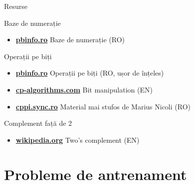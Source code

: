 \documentclass{beamer}
\begin{document}
\begin{frame}{Resurse}
  \begin{block}{Baze de numerație}
    \begin{itemize}
      \item \href{https://www.pbinfo.ro/articole/5562/baze-de-numeratie}{\textbf{pbinfo.ro}} \textemdash{} Baze de numerație (RO)
    \end{itemize}
  \end{block}
  \begin{block}{Operații pe biți}
    \begin{itemize}
      \item \href{https://www.pbinfo.ro/articole/62/operatii-pe-biti}{\textbf{pbinfo.ro}} \textemdash{} Operații pe biți (RO, ușor de înțeles)
      \item \href{https://cp-algorithms.com/algebra/bit-manipulation.html}{\textbf{cp-algorithms.com}} \textemdash{} Bit manipulation (EN)
      \item \href{https://cppi.sync.ro/materia/lectii/baze\%20de\%20numeratie,\%20scrierea\%20constantelor\%20si\%20operatii\%20pe\%20biti.pdf}{\textbf{cppi.sync.ro}} \textemdash{} Material mai stufos de Marius Nicoli (RO)
    \end{itemize}
  \end{block}
  \begin{block}{Complement față de 2}
    \begin{itemize}
      \item \href{https://en.wikipedia.org/wiki/Two\%27s_complement}{\textbf{wikipedia.org}} \textemdash{} Two's complement (EN)
    \end{itemize}
  \end{block}
\end{frame}

\section{Probleme de antrenament}
\end{document}
